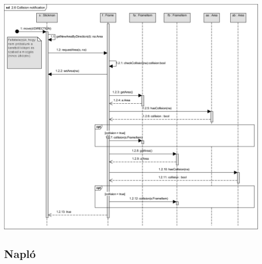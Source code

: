 		\begin{center}\includegraphics[scale=0.7, angle=-90]{resources/26Collisionnotification.png}\end{center}
	
	\subsection{Napló}

